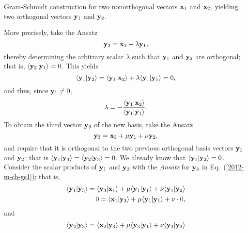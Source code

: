 {\begin{marginfigure}
{\begin{center}
\begin{tikzpicture}[ scale=0.6]
\end{tikzpicture}
\end{center}%
\caption{Gram-Schmidt construction for two nonorthogonal vectors ${\bf x}_1$ and ${\bf x}_2$,
yielding two  orthogonal vectors ${\bf y}_1$ and ${\bf y}_2$.}
}
  \label{2012-m-fdvs-ideaofGS}
\end{marginfigure}
More precisely, take the Ansatz
\begin{equation}
{\bf y}_2={\bf x}_2 + \lambda  {\bf y}_1,
\end{equation}
thereby determining the arbitrary scalar $\lambda$ such that
${\bf y}_1$
and
${\bf y}_2$
are orthogonal; that is,
$\langle{\bf y}_2 \vert  {\bf y}_1\rangle =0$.
This yields
\begin{equation}
\langle {\bf y}_1\vert  {\bf y}_2 \rangle
=\langle {\bf y}_1 \vert {\bf x}_2 \rangle
+ \lambda
\langle {\bf y}_1\vert  {\bf y}_1\rangle =0,
\end{equation}
and thus, since ${\bf y}_1 \neq 0$,
\begin{equation}
\lambda =
-
\frac{\langle {\bf y}_1 \vert {\bf x}_2 \rangle}
{\langle {\bf y}_1\vert {\bf y}_1 \rangle} .
\end{equation}
To obtain the third vector ${\bf y}_3$ of the new basis,
take the Ansatz
\begin{equation}
{\bf y}_3={\bf x}_3 + \mu  {\bf y}_1  + \nu  {\bf y}_2,
\label{2012-m-ch-gs1}
\end{equation}
and require that it is orthogonal to the two previous orthogonal basis vectors
${\bf y}_1$
and
${\bf y}_2$;
that is
$\langle {\bf y}_1\vert {\bf y}_3 \rangle =\langle  {\bf y}_2\vert{\bf y}_3  \rangle =0$.
We already know that $\langle {\bf y}_1\vert {\bf y}_2 \rangle = 0$.
Consider the scalar products of ${\bf y}_1$
and ${\bf y}_2$
with the {\it Ansatz} for ${\bf y}_3$ in Eq.~(\ref{2012-m-ch-gs1}); that is,
\begin{equation}
\begin{split}
\langle {\bf y}_1\vert {\bf y}_3\rangle
=
\langle {\bf y}_3 \vert {\bf x}_1 \rangle + \mu  \langle {\bf y}_1\vert {\bf y}_1 \rangle  + \nu  \langle {\bf y}_1\vert {\bf y}_2\rangle
\\
0
=
\langle {\bf x}_1 \vert {\bf y}_3 \rangle + \mu  \langle {\bf y}_1\vert {\bf y}_1 \rangle  + \nu  \cdot 0 ,
\end{split}
\end{equation}
and
\begin{equation}
\begin{split}
\langle{\bf y}_2 \vert {\bf y}_3\rangle =\langle {\bf x}_2\vert  {\bf y}_3\rangle + \mu  \langle {\bf y}_3\vert {\bf y}_1 \rangle  + \nu  \langle {\bf y}_2\vert {\bf y}_2\rangle

\end{split}
\end{equation}}
